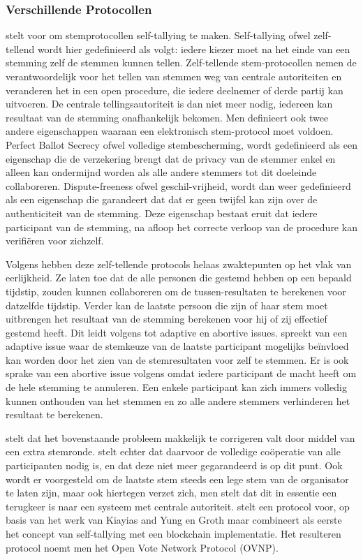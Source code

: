 		\subsubsection{Verschillende Protocollen}
		\textcite{Kiayias2002} stelt voor om stemprotocollen self-tallying te maken. Self-tallying ofwel zelf-tellend wordt hier gedefinieerd als volgt: iedere kiezer moet na het einde van een stemming zelf de stemmen kunnen tellen. Zelf-tellende stem-protocollen nemen de verantwoordelijk voor het tellen van stemmen weg van centrale autoriteiten en veranderen het in een open procedure, die iedere deelnemer of derde partij kan uitvoeren. De centrale tellingsautoriteit is dan niet meer nodig, iedereen kan resultaat van de stemming onafhankelijk bekomen. Men definieert ook twee andere eigenschappen waaraan een elektronisch stem-protocol moet voldoen.  Perfect Ballot Secrecy ofwel volledige stembescherming, wordt gedefinieerd als een eigenschap die de verzekering brengt dat de privacy van de stemmer enkel en alleen kan ondermijnd worden als alle andere stemmers tot dit doeleinde collaboreren. Dispute-freeness ofwel geschil-vrijheid, wordt dan weer gedefinieerd als een eigenschap die garandeert dat dat er geen twijfel kan zijn over de authenticiteit van de stemming. Deze eigenschap bestaat eruit dat iedere participant van de stemming, na afloop het correcte verloop van de procedure kan verifiëren voor zichzelf.
			
		Volgens \textcite{McCorry2017}  hebben deze zelf-tellende protocols helaas zwaktepunten op het vlak van eerlijkheid. Ze laten toe dat de alle personen die gestemd hebben op een bepaald tijdstip, zouden kunnen collaboreren om de tussen-resultaten te berekenen voor datzelfde tijdstip. Verder kan de laatste persoon die zijn of haar stem moet uitbrengen het resultaat van de stemming berekenen voor hij of zij effectief gestemd heeft. Dit leidt volgens \textcite{McCorry2017} tot adaptive en abortive issues.  \textcite{McCorry2017} spreekt van een adaptive issue waar de stemkeuze van de laatste participant mogelijks beïnvloed kan worden door het zien van de stemresultaten voor zelf te stemmen. Er is ook sprake van een abortive issue volgens \textcite{McCorry2017} omdat iedere participant de macht heeft om de hele stemming te annuleren. Een enkele participant kan zich immers volledig kunnen onthouden van het stemmen en zo alle andere stemmers verhinderen het resultaat te berekenen. 
			
		\textcite{Kiayias2002} stelt dat het bovenstaande probleem makkelijk te corrigeren valt door middel van een extra stemronde. \textcite{McCorry2017} stelt echter dat daarvoor de volledige coöperatie van alle participanten nodig is, en dat deze niet meer gegarandeerd is op dit punt. Ook wordt er voorgesteld om de laatste stem steeds een lege stem van de organisator te laten zijn, maar ook hiertegen verzet \textcite{McCorry2017} zich, men stelt dat dit in essentie een terugkeer is naar een systeem met centrale autoriteit.  \textcite{McCorry2017} stelt een protocol voor, op basis van het werk van Kiayias and Yung en Groth maar combineert als eerste het concept van self-tallying met een blockchain implementatie. Het resulteren protocol noemt men het Open Vote Network Protocol (OVNP).
		
